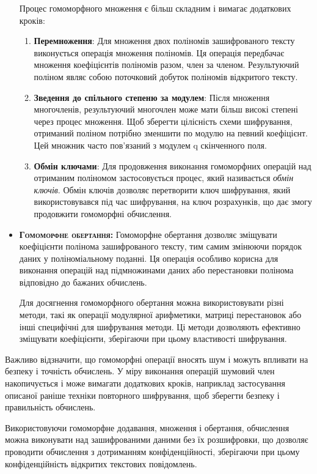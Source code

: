 \begin{itemize}
{    Процес гомоморфного множення є більш складним і вимагає додаткових кроків:
    \begin{enumerate}
        \item{\textbf{Перемноження}:
            Для множення двох поліномів зашифрованого тексту виконується операція множення
            поліномів. Ця операція передбачає множення коефіцієнтів поліномів разом, член
            за членом. Результуючий поліном являє собою поточковий добуток поліномів
        відкритого тексту.}
        \item{\textbf{Зведення до спільного степеню за модулем}:
            Після множення многочленів, результуючий многочлен може мати більш високі
            степені через процес множення. Щоб зберегти цілісність схеми шифрування,
            отриманий поліном потрібно зменшити по модулю на певний коефіцієнт. Цей множник
            часто пов'язаний з модулем q скінченного поля.}
        \item{\textbf{Обмін ключами}: 
            Для продовження виконання гомоморфних операцій над отриманим поліномом
            застосовується процес, який називається \emph{обмін ключів}. Обмін ключів
            дозволяє перетворити ключ шифрування, який використовувався під час шифрування,
        на ключ розрахунків, що дає змогу продовжити гомоморфні обчислення.}
    \end{enumerate}
}
\item{\textsc{\textbf{Гомоморфне обертання:}}
    Гомоморфне обертання дозволяє зміщувати коефіцієнти полінома зашифрованого тексту, тим
    самим змінюючи порядок даних у поліноміальному поданні. Ця операція особливо корисна
    для виконання операцій над підмножинами даних або перестановки полінома відповідно до
    бажаних обчислень.

    Для досягнення гомоморфного обертання можна використовувати різні методи, такі як
    операції модулярної арифметики, матриці перестановок або інші специфічні для шифрування
    методи. Ці методи дозволяють ефективно зміщувати коефіцієнти, зберігаючи при цьому
    властивості шифрування.
}

\end{itemize}
Важливо відзначити, що гомоморфні операції вносять шум і можуть впливати на безпеку і
точність обчислень. У міру виконання операцій шумовий член накопичується і може вимагати
додаткових кроків, наприклад застосування описаної раніше техніки повторного шифрування,
щоб зберегти безпеку і правильність обчислень.

Використовуючи гомоморфне додавання, множення і обертання, обчислення можна виконувати над
зашифрованими даними без їх розшифровки, що дозволяє проводити обчислення з дотриманням
конфіденційності, зберігаючи при цьому конфіденційність відкритих текстових
повідомлень.

